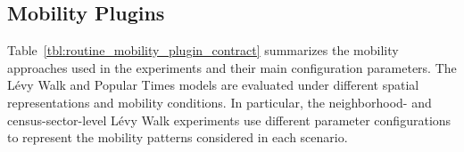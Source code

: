 

\subsection{Mobility Plugins}
\label{sec:routine_mobility_plugins}

Table~\ref{tbl:routine_mobility_plugin_contract} summarizes the mobility approaches used in the experiments and their main configuration parameters. The L\'evy Walk and Popular Times models are evaluated under different spatial representations and mobility conditions. In particular, the neighborhood- and census-sector-level L\'evy Walk experiments use different parameter configurations to represent the mobility patterns considered in each scenario.

